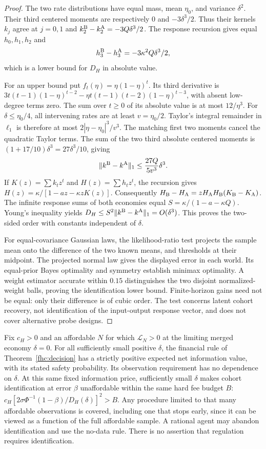 \begin{proof}
The two rate distributions have equal mass, mean $\eta_0$, and variance
$\delta^2$. Their third centered moments are respectively $0$ and
$-3\delta^3/2$. Thus their kernels $k_j$ agree at $j=0,1$ and
$k^{\rm B}_2-k^{\rm A}_2=-3Q\delta^3/2$. The response recursion
gives equal $h_0,h_1,h_2$ and
\[
 h^{\rm B}_3-h^{\rm A}_3=-3\kappa^2Q\delta^3/2,
\]
which is a lower bound for $D_H$ in absolute value.

For an upper bound put $f_t(\eta)=\eta(1-\eta)^t$.
Its third derivative is
$3t(t-1)(1-\eta)^{t-2}
-\eta t(t-1)(t-2)(1-\eta)^{t-3}$, with absent low-degree terms zero.
The sum over $t\ge0$ of its absolute value is at most $12/\eta^3$.
For $\delta\le\eta_0/4$, all intervening rates are at least
$v=\eta_0/2$. Taylor's integral remainder in $\ell_1$ is therefore at
most $2|\eta-\eta_0|^3/v^3$. The matching first two moments cancel
the quadratic Taylor terms. The sum of the two third absolute centered
moments is $(1+17/10)\delta^3=27\delta^3/10$, giving
\[
 \|k^{\rm B}-k^{\rm A}\|_1\le\frac{27Q}{5v^3}\delta^3.
\]
If $K(z)=\sum k_tz^t$ and $H(z)=\sum h_tz^t$, the recursion gives
$H(z)=\kappa/[1-az-\kappa zK(z)]$. Consequently
$H_{\rm B}-H_{\rm A}=zH_{\rm A}H_{\rm B}(K_{\rm B}-K_{\rm A})$.
The infinite response sums of both economies equal
$S=\kappa/(1-a-\kappa Q)$. Young's inequality yields
$D_H\le S^2\|k^{\rm B}-k^{\rm A}\|_1=O(\delta^3)$.
This proves the two-sided order with constants independent of $\delta$.

For equal-covariance Gaussian laws, the likelihood-ratio test projects the
sample mean onto the difference of the two known means, and thresholds at
their midpoint. The projected normal law gives the displayed error in each
world. Its equal-prior Bayes optimality and symmetry establish minimax
optimality. A weight estimator accurate within $0.15$ distinguishes the
two disjoint normalized-weight balls, proving the identification lower bound.
Finite-horizon gains need not be equal: only their difference is of cubic
order. The test concerns latent cohort recovery, not identification of the
input-output response vector, and does not cover alternative probe designs.
\end{proof}

\begin{corollary}\label{fhc:priced}
Fix $c_H>0$ and an affordable $N$ for which $\mathcal L_N>0$ at the limiting merged
economy $\delta=0$. For all sufficiently small positive $\delta$, the
financial rule of Theorem~\ref{fhc:decision} has a
strictly positive expected net information value, with its stated safety
probability. Its observation requirement has no dependence on $\delta$.
At this same fixed information price, sufficiently small $\delta$ makes cohort
identification at error $\beta$ unaffordable within the same hard fee budget
$B$: $c_H[2\sigma\Phi^{-1}(1-\beta)/D_H(\delta)]^2>B$.
Any procedure limited to that many affordable observations is covered,
including one that stops early, since it can be viewed as a function of the
full affordable sample. A rational agent may abandon identification and use
the no-data rule. There is no assertion that regulation requires identification.
\end{corollary}

